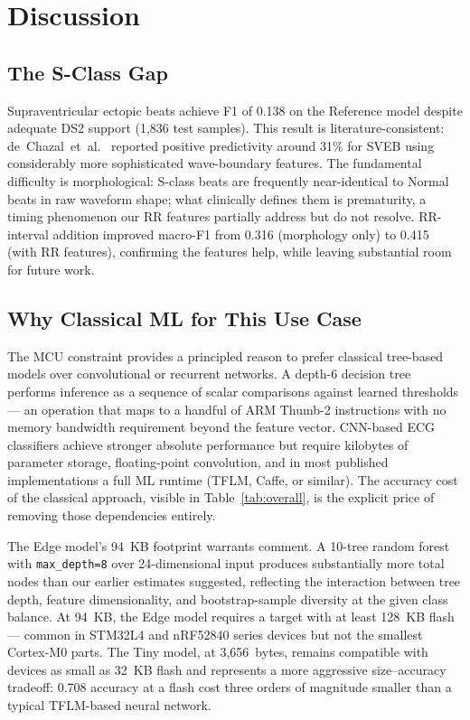 \documentclass[journal,twoside]{IEEEtran}
\begin{document}
\section{Discussion}

\subsection{The S-Class Gap}

Supraventricular ectopic beats achieve F1 of 0.138 on the Reference model
despite adequate DS2 support (1,836 test samples). This result is
literature-consistent: de~Chazal~et~al.\ \cite{deChazal2004} reported
positive predictivity around 31\% for SVEB using considerably more
sophisticated wave-boundary features. The fundamental difficulty is
morphological: S-class beats are frequently near-identical to Normal beats
in raw waveform shape; what clinically defines them is prematurity, a
timing phenomenon our RR features partially address but do not resolve.
RR-interval addition improved macro-F1 from 0.316 (morphology only) to
0.415 (with RR features), confirming the features help, while leaving
substantial room for future work.

\subsection{Why Classical ML for This Use Case}

The MCU constraint provides a principled reason to prefer classical
tree-based models over convolutional or recurrent networks. A depth-6
decision tree performs inference as a sequence of scalar comparisons
against learned thresholds — an operation that maps to a handful of
ARM Thumb-2 instructions with no memory bandwidth requirement beyond
the feature vector. CNN-based ECG classifiers achieve stronger absolute
performance but require kilobytes of parameter storage, floating-point
convolution, and in most published implementations a full ML runtime
(TFLM, Caffe, or similar). The accuracy cost of the classical
approach, visible in Table~\ref{tab:overall}, is the explicit price
of removing those dependencies entirely.

The Edge model's 94~KB footprint warrants comment. A 10-tree random
forest with \texttt{max\_depth=8} over 24-dimensional input produces
substantially more total nodes than our earlier estimates suggested,
reflecting the interaction between tree depth, feature dimensionality,
and bootstrap-sample diversity at the given class balance. At 94~KB,
the Edge model requires a target with at least 128~KB flash — common
in STM32L4 and nRF52840 series devices but not the smallest Cortex-M0
parts. The Tiny model, at 3{,}656~bytes, remains compatible with
devices as small as 32~KB flash and represents a more aggressive
size--accuracy tradeoff: 0.708 accuracy at a flash cost three orders
of magnitude smaller than a typical TFLM-based neural network.
\end{document}

